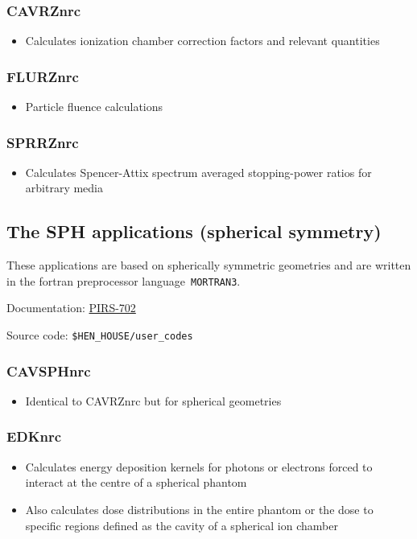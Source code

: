 \documentclass[12pt,twoside]{article}
\begin{document}
\subsubsection{CAVRZnrc}
\begin{itemize}
\item Calculates ionization chamber correction factors and relevant quantities
\end{itemize}
\subsubsection{FLURZnrc}
\begin{itemize}
\item Particle fluence calculations
\end{itemize}
\subsubsection{SPRRZnrc}
\begin{itemize}
\item Calculates Spencer-Attix spectrum averaged stopping-power ratios for arbitrary media
\end{itemize}

\clearpage
\subsection{The SPH applications (spherical symmetry)}
These applications are based on spherically symmetric geometries and are
written in the fortran preprocessor language \,\Verb|MORTRAN3|.

Documentation: \href{http://nrc-cnrc.github.io/EGSnrc/doc/pirs702-egsnrc-codes.pdf}{PIRS-702}

Source code: \Verb+$HEN_HOUSE/user_codes+

\subsubsection{CAVSPHnrc}
\begin{itemize}
\item Identical to CAVRZnrc but for spherical geometries
\end{itemize}
\subsubsection{EDKnrc}
\begin{itemize}
\item Calculates energy deposition kernels for photons or electrons forced to interact
at the centre of a spherical phantom
\item Also calculates dose distributions in the entire phantom or the dose to specific regions defined as the cavity of a spherical ion chamber
\end{itemize}
\end{document}
